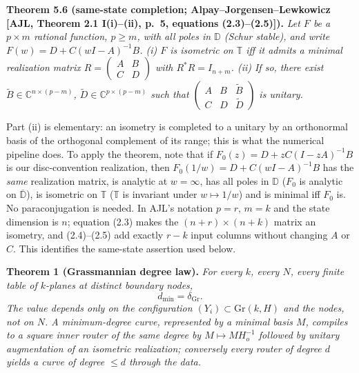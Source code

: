 \documentclass[
  11pt,
  a4paper,
]{article}
\begin{document}
\textbf{Theorem 5.6 (same-state completion; Alpay--Jorgensen--Lewkowicz
{[}AJL, Theorem 2.1 I(i)--(ii), p.~5, equations (2.3)--(2.5){]}).}
\emph{Let \(F\) be a \(p\times m\) rational function, \(p\ge m\), with
all poles in \(\mathbb D\) (Schur stable), and write
\(F(w)=D+C(wI-A)^{-1}B\). (i) \(F\) is isometric on \(\mathbb T\) iff it
admits a minimal realization matrix
\(R=\begin{pmatrix}A&B\\ C&D\end{pmatrix}\) with \(R^*R=I_{n+m}\). (ii)
If so, there exist \(\tilde B\in\mathbb C^{n\times(p-m)}\),
\(\tilde D\in\mathbb C^{p\times(p-m)}\) such that
\(\begin{pmatrix}A&B&\tilde B\\ C&D&\tilde D\end{pmatrix}\) is unitary.}

Part (ii) is elementary: an isometry is completed to a unitary by an
orthonormal basis of the orthogonal complement of its range; this is
what the numerical pipeline does. To apply the theorem, note that if
\(F_0(z)=D+zC(I-zA)^{-1}B\) is our disc-convention realization, then
\(F_0(1/w)=D+C(wI-A)^{-1}B\) has the \emph{same} realization matrix, is
analytic at \(w=\infty\), has all poles in \(\mathbb D\) (\(F_0\) is
analytic on \(\overline{\mathbb D}\)), is isometric on \(\mathbb T\)
(\(\mathbb T\) is invariant under \(w\mapsto1/w\)) and is minimal iff
\(F_0\) is. No paraconjugation is needed. In AJL's notation \(p=r\),
\(m=k\) and the state dimension is \(n\); equation (2.3) makes the
\((n+r)\times(n+k)\) matrix an isometry, and (2.4)--(2.5) add exactly
\(r-k\) input columns without changing \(A\) or \(C\). This identifies
the same-state assertion used below.

\textbf{Theorem 1 (Grassmannian degree law).} \emph{For every \(k\),
every \(N\), every finite table of \(k\)-planes at distinct boundary
nodes,} \[d_{\min}=\delta_{\mathrm{Gr}} .\] \emph{The value depends only
on the configuration \((Y_i)\subset\mathrm{Gr}(k,\allowbreak{}H)\) and the nodes, not
on \(N\). A minimum-degree curve, represented by a minimal basis \(M\),
compiles to a square inner router of the same degree by
\(M\mapsto MH_o^{-1}\) followed by unitary augmentation of an isometric
realization; conversely every router of degree \(d\) yields a curve of
degree \(\le d\) through the data.}
\end{document}

